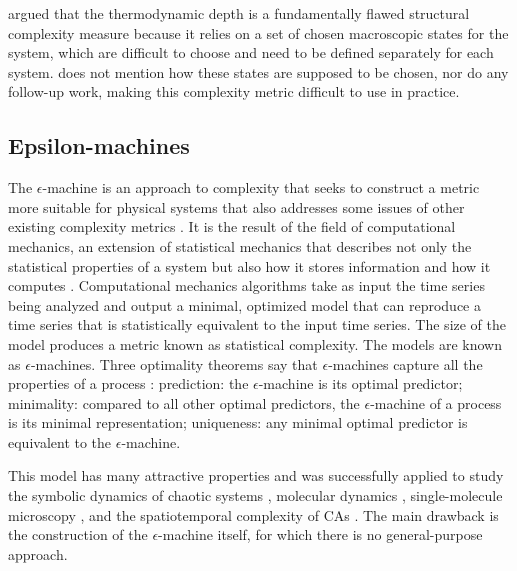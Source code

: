 \textcite{crutchfieldThermodynamicDepthCausal1999} argued that the thermodynamic
depth is a fundamentally flawed structural complexity measure because it relies
on a set of chosen macroscopic states for the system, which are difficult to
choose and need to be defined separately for each system.
\textcite{lloydComplexityThermodynamicDepth1988} does not mention how these states
are supposed to be chosen, nor do any follow-up work, making this complexity
metric difficult to use in practice.

\subsection{Epsilon-machines}

The $\epsilon$-machine is an approach to complexity that seeks to construct a metric
more suitable for physical systems that also addresses some issues of other
existing complexity metrics \parencite{crutchfieldOrderChaos2012}. It is the
result of the field of computational mechanics, an extension of statistical
mechanics that describes not only the statistical properties of a system but
also how it stores information and how it computes
\parencite{crutchfieldInferringStatisticalComplexity1989,
  crutchfieldCalculiEmergenceComputation1994,
  feldmanMeasuresStatisticalComplexity1998, crutchfieldOrderChaos2012}.
Computational mechanics algorithms take as input the time series being analyzed
and output a minimal, optimized model that can reproduce a time series that is
statistically equivalent to the input time series. The size of the model
produces a metric known as statistical complexity. The models are known as
$\epsilon$-machines. Three optimality theorems say that $\epsilon$-machines capture all the
properties of a process
\parencite{crutchfieldInferringStatisticalComplexity1989,
  crutchfieldThermodynamicDepthCausal1999,
  shaliziComputationalMechanicsPattern2001}: prediction: the $\epsilon$-machine is its
optimal predictor; minimality: compared to all other optimal predictors, the
$\epsilon$-machine of a process is its minimal representation; uniqueness: any minimal
optimal predictor is equivalent to the $\epsilon$-machine.

This model has many attractive properties and was successfully applied to study
the symbolic dynamics of chaotic systems
\parencite{crutchfieldCalculiEmergenceComputation1994}, molecular dynamics
\parencite{ryabovComputationalMechanicsMolecular2011}, single-molecule
microscopy \parencite{kellyNewMethodInferring2012}, and the spatiotemporal
complexity of \acp{CA} \parencite{crutchfieldTurbulentPatternBases1993,
  hansonComputationalMechanicsCellular1997,
  shaliziQuantifyingSelfOrganizationOptimal2004}. The main drawback is the
construction of the $\epsilon$-machine itself, for which there is no
general-purpose approach.

